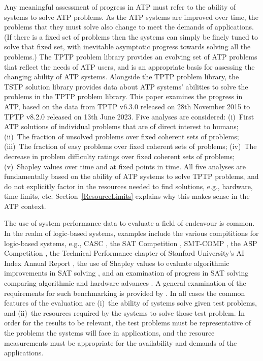 \documentclass[runningheads]{llncs}
\begin{document}
Any meaningful assessment of progress in ATP must refer to the ability of systems to solve 
ATP problems.
As the ATP systems are improved over time, the problems that they must solve also change to meet 
the demands of applications.
(If there is a fixed set of problems then the systems can simply be finely tuned to solve that
fixed set, with inevitable asymptotic progress towards solving all the problems.)
The TPTP problem library provides an evolving set of ATP problems that reflect the needs of 
ATP users, and is an appropriate basis for assessing the changing ability of ATP systems.
Alongside the TPTP problem library, the TSTP solution library provides data about ATP 
systems' abilities to solve the problems in the TPTP problem library.
This paper examines the progress in ATP, based on the data from TPTP v6.3.0 released on 
28th November 2015 to TPTP v8.2.0 released on 13th June 2023.
Five analyses are considered:
(i)~First ATP solutions of individual problems that are of direct interest to humans;
(ii)~The fraction of unsolved problems over fixed coherent sets of problems;
(iii)~The fraction of easy problems over fixed coherent sets of problems;
(iv)~The decrease in problem difficulty ratings over fixed coherent sets of problems;
(v)~Shapley values over time and at fixed points in time.
All five analyses are fundamentally based on the ability of ATP systems to solve TPTP problems, and 
do not explicitly factor in the resources needed to find solutions, e.g., hardware, time limits, 
etc. 
Section~\ref{ResourceLimits} explains why this makes sense in the ATP context.

The use of system performance data to evaluate a field of endeavour is common.
In the realm of logic-based systems, examples include
the various compititions \cite{BB+19} for logic-based systems, e.g., CASC \cite{Sut16}, the SAT 
Competition \cite{JL+12}, SMT-COMP \cite{BdS05,CSW15}, the ASP Competition \cite{CI+12},
the Technical Performance chapter of Stanford University's AI Index Annual Report \cite{MF+23},
the use of Shapley values to evaluate algorithmic improvements in SAT solving \cite{FK+16,KF+19},
and
an examination of progress in SAT solving comparing algorithmic and hardware advances \cite{FHS20}.
A general examination of the requirements for such benchmarking is provided by \cite{BLW19}.
In all cases the common features of the evaluation are (i)~the ability of systems solve given test
problems, and (ii)~the resources required by the systems to solve those test problem.
In order for the results to be relevant, the test problems must be representative of the problems
the systems will face in applications, and the resource measurements must be appropriate for 
the availability and demands of the applications.
\end{document}
